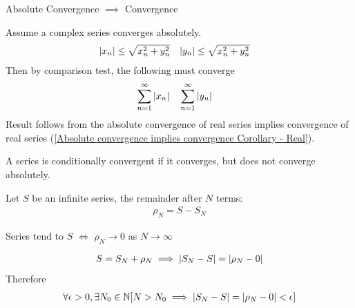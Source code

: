 \documentclass[12pt, english]{book}
\makeatletter
\renewenvironment{proof}[1][\proofname]{\par
	\pushQED{\qed}%
	\normalfont \topsep6\p@\@plus6\p@\relax
	\list{}{%
		\settowidth{\leftmargin}{\itshape\proofname:\hskip\labelsep}%
		\setlength{\labelwidth}{0pt}%
		\setlength{\itemindent}{-\leftmargin}%
		}%
	\item[\hskip\labelsep\itshape#1\@addpunct{:}]\ignorespaces
	}{\popQED\endlist\@endpefalse}
\makeatother
\begin{document}
	\begin{corollary}
		\label{Absolute convergence implies convergence (Complex) Corollary - Complex}
		Absolute Convergence \(\implies\) Convergence
	\end{corollary}
	\begin{proof}
		Assume a complex series converges absolutely. 
		\begin{align*}
			\abs{x_n} &\leq \sqrt{x_n^2 + y_n^2} & \abs{y_n} &\leq \sqrt{x_n^2 + y_n^2}
		\end{align*}
		Then by comparison test, the following must converge
		\begin{align*}
			\sum_{n=1}^{\infty} \abs{x_n} &&& \sum_{n=1}^{\infty} \abs{y_n}
		\end{align*}
		Result follows from the absolute convergence of real series implies convergence of real series (\cref{Absolute convergence implies convergence Corollary - Real}). 
	\end{proof}

	\begin{definition}
		\label{Conditional Convergence Definition - Complex}
		A series is conditionally convergent if it converges, but does not converge absolutely. 
	\end{definition}

	\begin{definition}
		Let \(S\) be an infinite series, the remainder after \(N\) terms:
		\begin{align*}
			\rho_N = S - S_N
		\end{align*}
	\end{definition}

	\begin{corollary}
		Series tend to \(S\) \(\iff\) \(\rho_N \rightarrow 0\) as \(N \rightarrow \infty\)
	\end{corollary}
	\begin{proof}
		\begin{align*}
			S = S_N + \rho_N \implies \abs{S_N - S} = \abs{\rho_N - 0}
		\end{align*}
		{\color{Grey}
		Therefore
		\begin{align*}
			\forall \epsilon > 0, \exists N_0 \in \mathbb{N}
			[N > N_0 \implies \abs{S_N - S} = \abs{\rho_N - 0} < \epsilon]
		\end{align*}
		}
	\end{proof}
\end{document}
